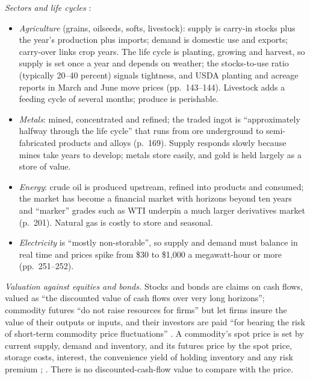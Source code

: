 \begin{qfmethod}\label{meth:commodity-sectors-participants}
 \emph{Sectors and life cycles} \citep[pp.~143--144, 169, 201, 251--252]{physical-geman-commodities-2005}:
\begin{itemize}
\item \emph{Agriculture} (grains, oilseeds, softs, livestock): supply is carry-in stocks plus the year's production plus imports; demand is domestic use and exports; carry-over links crop years. The life cycle is planting, growing and harvest, so supply is set once a year and depends on weather; the stocks-to-use ratio (typically 20--40 percent) signals tightness, and USDA planting and acreage reports in March and June move prices (pp.~143--144). Livestock adds a feeding cycle of several months; produce is perishable.
\item \emph{Metals}: mined, concentrated and refined; the traded ingot is ``approximately halfway through the life cycle'' that runs from ore underground to semi-fabricated products and alloys (p.~169). Supply responds slowly because mines take years to develop; metals store easily, and gold is held largely as a store of value.
\item \emph{Energy}: crude oil is produced upstream, refined into products and consumed; the market has become a financial market with horizons beyond ten years and ``marker'' grades such as WTI underpin a much larger derivatives market (p.~201). Natural gas is costly to store and seasonal.
\item \emph{Electricity} is ``mostly non-storable'', so supply and demand must balance in real time and prices spike from \$30 to \$1,000 a megawatt-hour or more (pp.~251--252).
\end{itemize}

\emph{Valuation against equities and bonds.} Stocks and bonds are claims on cash flows, valued as ``the discounted value of cash flows over very long horizons''; commodity futures ``do not raise resources for firms'' but let firms insure the value of their outputs or inputs, and their investors are paid ``for bearing the risk of short-term commodity price fluctuations'' \citep[p.~2]{s16-r34}. A commodity's spot price is set by current supply, demand and inventory, and its futures price by the spot price, storage costs, interest, the convenience yield of holding inventory and any risk premium \citep[pp.~24--25, 33--34]{physical-geman-commodities-2005}; \citep[pp.~365, 370]{s7-ang}. There is no discounted-cash-flow value to compare with the price.


\end{qfmethod}
